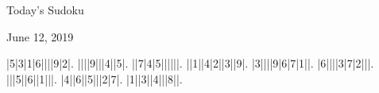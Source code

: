 \documentclass{article}
\begin{document}
\begin{center}
\Huge{Today's Sudoku}
\end{center}
\begin{center}
\Large{June 12, 2019}
\end{center}
\begin{sudoku}
|5|3|1|6||||9|2|.
||||9|||4||5|.
||7|4|5||||||.
||1||4|2||3||9|.
|3||||9|6|7|1||.
|6||||3|7|2|||.
|||5||6||1|||.
|4||6||5|||2|7|.
|1||3||4|||8||.
\end{sudoku}
\end{document}
